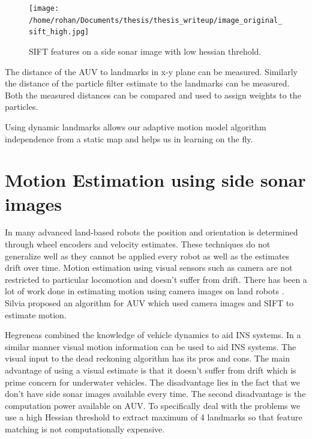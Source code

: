 \documentclass[12pt]{dalcsthesis}
\begin{document}
\begin{figure}
  \centering
     {\texttt{[image: /home/rohan/Documents/thesis/thesis\_writeup/image\_original\_sift\_high.jpg]}}
  \caption{\label{fig- side sonar sift high} SIFT features on a side sonar image with low hessian threhold.}
\end{figure}


The distance of the AUV to landmarks in x-y plane can be measured. Similarly the distance of the particle filter estimate to the landmarks can be measured. Both the measured distances can be compared and used to assign weights to the particles. 

Using dynamic landmarks allows our adaptive motion model algorithm independence from a static map and helps us in learning on the fly.  

\section{Motion Estimation using side sonar images}

In many advanced land-based robots the position and orientation is determined through wheel encoders and velocity estimates. These techniques do not generalize well as they cannot be applied every robot as well as the estimates drift over time. Motion estimation using visual sensors such as camera are not restricted to particular locomotion and doesn't suffer from drift. There has been a lot of work done in estimating motion using camera images on land robots \cite{barfoot2005online} \cite{scaramuzza2008appearance}. Silvia \cite{Silva} proposed an algorithm for AUV which used camera images and SIFT to estimate motion. 

Hegreneas \cite{hegrenaes2008model} combined the knowledge of vehicle dynamics to aid INS systems. In a similar manner visual motion information can be used to aid INS systems. The visual input to the dead reckoning algorithm has its pros and cons. The main advantage of using a visual estimate is that it doesn't suffer from drift which is prime concern for underwater vehicles. The disadvantage lies in the fact that we don't have side sonar images available every time. The second disadvantage is the computation power available on AUV. To specifically deal with the problems we use a high Hessian threshold to extract maximum of 4 landmarks so that feature matching is not computationally expensive.    
\end{document}
